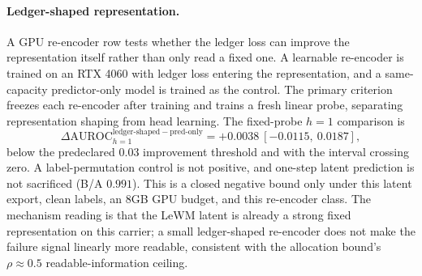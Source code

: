 \paragraph{Ledger-shaped representation.}
A GPU re-encoder row tests whether the ledger loss can improve the
representation itself rather than only read a fixed one.  A learnable
re-encoder is trained on an RTX 4060 with ledger loss entering the
representation, and a same-capacity predictor-only model is trained as the
control.  The primary criterion freezes each re-encoder after training and
trains a fresh linear probe, separating representation shaping from head
learning.  The fixed-probe $h=1$ comparison is
$$
\Delta\mathrm{AUROC}_{h=1}^{\mathrm{ledger\mbox{-}shaped-pred\mbox{-}only}}
= +0.0038\ [-0.0115,\ 0.0187],
$$
below the predeclared $0.03$ improvement threshold and with the interval
crossing zero.  A label-permutation control is not positive, and one-step
latent prediction is not sacrificed (B/A $0.991$).  This is a closed negative
bound only under this latent export, clean labels, an $8$GB GPU budget, and
this re-encoder class.  The mechanism reading is that the LeWM latent is
already a strong fixed representation on this carrier; a small ledger-shaped
re-encoder does not make the failure signal linearly more readable, consistent
with the allocation bound's $\rho\approx 0.5$ readable-information ceiling.

